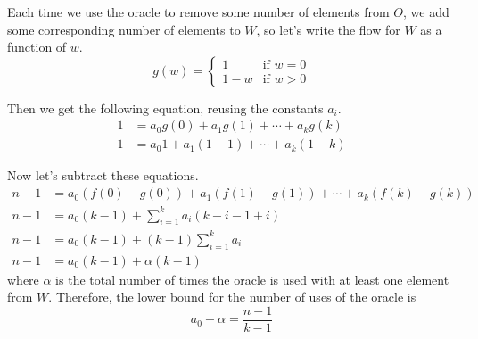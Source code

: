 \documentclass{article}
\begin{document}
\begin{description}
        Each time we use the oracle to remove some number of elements from $O$,
        we add some corresponding number of elements to $W$, so let's write the
        flow for $W$ as a function of $w$.
        $$
        g(w) = \begin{cases}
            1 & \text{if } w = 0 \\
            1 - w & \text{if } w > 0
        \end{cases}
        $$

        Then we get the following equation, reusing the constants $a_i$.
        \begin{align*}
            1 &= a_0 g(0) + a_1 g(1) + \cdots + a_k g(k) \\
            1 &= a_0 1 + a_1 (1 - 1) + \cdots + a_k (1 - k)
        \end{align*}

        Now let's subtract these equations.
        \begin{align*}
            n - 1 &= a_0 \left(f(0) - g(0)\right) + a_1 \left(f(1) - g(1)\right) + \cdots + a_k \left(f(k) - g(k)\right) \\
            n - 1 &= a_0 \left(k - 1\right) + \sum_{i=1}^k a_i \left(k - i - 1 + i\right) \\
            n - 1 &= a_0 \left(k - 1\right) + (k-1) \sum_{i=1}^k a_i \\
            n - 1 &= a_0 (k - 1) + \alpha (k - 1)
        \end{align*}
        where $\alpha$ is the total number of times the oracle is used with at
        least one element from $W$.
        Therefore, the lower bound for the number of uses of the oracle is
        $$ a_0 + \alpha = \frac{n - 1}{k - 1} $$
\end{description}
\end{document}
